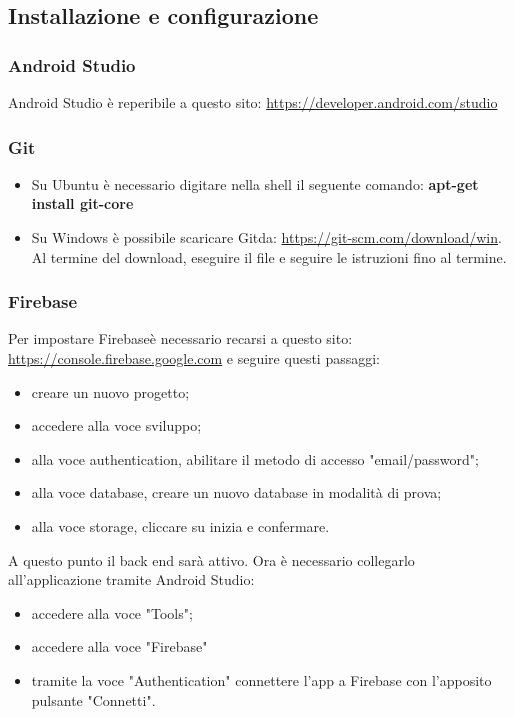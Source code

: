 \subsection{Installazione e configurazione}
\subsubsection{Android Studio} 
Android Studio è reperibile a questo sito: \url{https://developer.android.com/studio}
\subsubsection{Git}
\begin{itemize}
	\item Su Ubuntu è necessario digitare nella shell il seguente comando: \textbf{apt-get install git-core}
	\item Su Windows è possibile scaricare Git\glosp da: \url{https://git-scm.com/download/win}.
	Al termine del download, eseguire il file e seguire le istruzioni fino al termine.
\end{itemize}
\subsubsection{Firebase}
Per impostare Firebase\glosp è necessario recarsi a questo sito: \url{https://console.firebase.google.com} e seguire questi passaggi:
\begin{itemize}
	\item creare un nuovo progetto;
	\item accedere alla voce sviluppo;
	\item alla voce authentication, abilitare il metodo di accesso "email/password";
	\item alla voce database, creare un nuovo database in modalità di prova;
	\item alla voce storage, cliccare su inizia e confermare.
\end{itemize}
A questo punto il back end sarà attivo. Ora è necessario collegarlo all'applicazione tramite Android Studio:
\begin{itemize}
	\item accedere alla voce "Tools";
	\item accedere alla voce "Firebase"
	\item tramite la voce "Authentication" connettere l'app a Firebase con l'apposito pulsante "Connetti".
\end{itemize}
 

